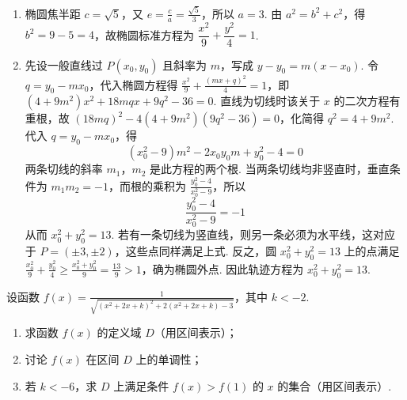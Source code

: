 \begin{solution}
\begin{enumerate}
\item 椭圆焦半距 \(c=\sqrt5\)，又 \(e=\frac ca=\frac{\sqrt5}{3}\)，所以 \(a=3\). 由 \(a^2=b^2+c^2\)，得 \(b^2=9-5=4\)，故椭圆标准方程为
\(\dfrac{x^2}{9}+\dfrac{y^2}{4}=1\).

\item 先设一般直线过 \(P(x_0,y_0)\) 且斜率为 \(m\)，写成 \(y-y_0=m(x-x_0)\). 令 \(q=y_0-mx_0\)，代入椭圆方程得
\(\frac{x^2}{9}+\frac{(mx+q)^2}{4}=1\)，即
\((4+9m^2)x^2+18mqx+9q^2-36=0\). 直线为切线时该关于 \(x\) 的二次方程有重根，故
\((18mq)^2-4(4+9m^2)(9q^2-36)=0\)，化简得 \(q^2=4+9m^2\). 代入 \(q=y_0-mx_0\)，得
\[
(x_0^2-9)m^2-2x_0y_0m+y_0^2-4=0
\]
两条切线的斜率 \(m_1\)，\(m_2\) 是此方程的两个根. 当两条切线均非竖直时，垂直条件为 \(m_1m_2=-1\)，而根的乘积为 \(\frac{y_0^2-4}{x_0^2-9}\)，所以
\[
\frac{y_0^2-4}{x_0^2-9}=-1
\]
从而 \(x_0^2+y_0^2=13\).
若有一条切线为竖直线，则另一条必须为水平线，这对应于 \(P=(\pm3,\pm2)\)，这些点同样满足上式. 反之，圆 \(x_0^2+y_0^2=13\) 上的点满足 \(\frac{x_0^2}{9}+\frac{y_0^2}{4}\geqslant\frac{x_0^2+y_0^2}{9}=\frac{13}{9}>1\)，确为椭圆外点. 因此轨迹方程为
\(x_0^2+y_0^2=13\).
\end{enumerate}
\end{solution}

\begin{problem}
设函数 \( f(x) = \frac{1}{\sqrt{(x^2 + 2x + k)^2 + 2(x^2 + 2x + k) - 3}} \)，其中 \( k < -2 \).

\begin{enumerate}
\item 求函数 \( f(x) \) 的定义域 \(D\)（用区间表示）；
\item 讨论 \(f(x)\) 在区间 \(D\) 上的单调性；
\item 若 \(k < -6\)，求 \(D\) 上满足条件 \(f(x) > f(1)\) 的 \(x\) 的集合（用区间表示）.
\end{enumerate}
\end{problem}

